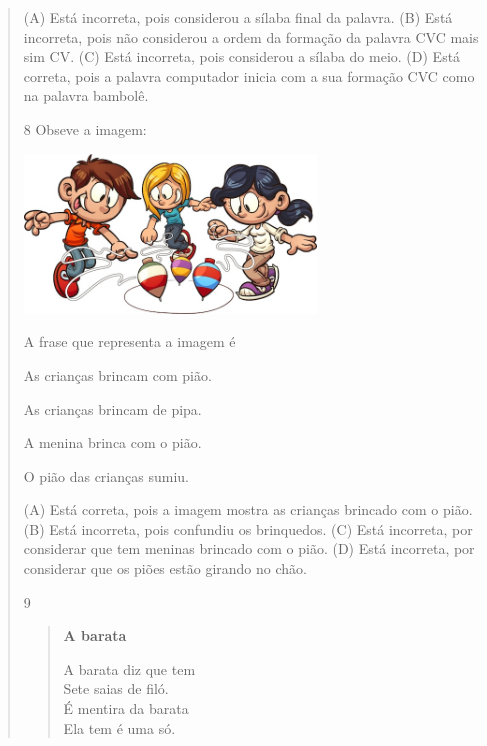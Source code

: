 \begin{verse}
(A) Está incorreta, pois considerou a sílaba final da palavra.
(B) Está incorreta, pois não considerou a ordem da formação da palavra
CVC mais sim CV.
(C) Está incorreta, pois considerou a sílaba do meio.
(D) Está correta, pois a palavra computador inicia com a sua formação
CVC como na palavra bambolê.

\num{8} Obseve a imagem:

\includegraphics[width=3.05095in,height=1.66841in]{media/image144.jpeg}


A frase que representa a imagem é

\begin{escolha}
\item As crianças brincam com pião.

\item As crianças brincam de pipa.

\item A menina brinca com o pião.

\item O pião das crianças sumiu.
\end{escolha}


(A) Está correta, pois a imagem mostra as crianças brincado com o pião.
(B) Está incorreta, pois confundiu os brinquedos.
(C) Está incorreta, por considerar que tem meninas brincado com o pião.
(D) Está incorreta, por considerar que os piões estão girando no chão.

\num{9}

\begin{verse}
\textbf{A barata}

A barata diz que tem\\
Sete saias de filó.\\
É mentira da barata\\
Ela tem é uma só.


\end{verse}
\end{verse}
